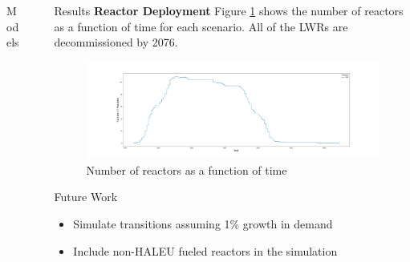 \documentclass[final]{beamer}
\newlength{\sepwid}
\newlength{\onecolwid}
\newlength{\threecolwid}
\begin{document}
\begin{frame}[t]
\begin{columns}[t,totalwidth=\threecolwid]
\begin{column}{\onecolwid}
\begin{block}{Models}
\end{block}



\end{column} %

\begin{column}{\sepwid}\end{column} %

\begin{column}{\onecolwid} %

\begin{block}{Results}
\textbf{Reactor Deployment}
Figure \ref{fig:rx_deployment} shows the number of reactors as a function of 
time for each scenario.
All of the \gls{LWR}s are decommissioned by 2076.
\begin{figure}
  \centering
  \includegraphics[scale=0.65, trim=100 0 50 50, clip]{rx_deployment_2020.png}
  \caption{Number of reactors as a function of time}
  \label{fig:rx_deployment}
\end{figure}


\end{block}

\begin{alertblock}{Future Work }
\begin{itemize}
		\item Simulate transitions assuming 1\% growth in demand
		\item Include non-\gls{HALEU} fueled reactors in the simulation
\end{itemize}

\end{alertblock}




\end{column}
\end{columns}
\end{frame}
\end{document}
